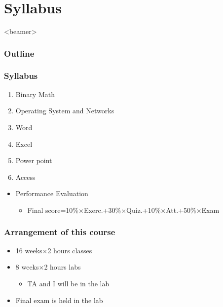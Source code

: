 \section{Syllabus}
\label{sec:sylla}
\begin{frame}<beamer>
    \frametitle{Outline}
    \tableofcontents[currentsection]
\end{frame}

\begin{frame}
	\frametitle{Syllabus}
	\begin{enumerate}
		\item {Binary Math}
		\item {Operating System and Networks}
		\item {Word}
		\item {Excel}
		\item {Power point}
		\item {Access}
	\end{enumerate}
	\begin{itemize}
		\item {Performance Evaluation}
		\begin{itemize}
			\item {Final score=10\%{$\times$}Exerc.+30\%{$\times$}Quiz.+10\%{$\times$}Att.+50\%{$\times$}Exam}
		\end{itemize}
	\end{itemize}
\end{frame}

\begin{frame}
	\frametitle{Arrangement of this course}
\begin{itemize}
	\item {16 weeks${\times}$2 hours classes}
	\item {8 weeks${\times}$2 hours labs}
	\begin{itemize}
			\item {TA and I will be in the lab}
	\end{itemize}
	\item {Final exam is held in the lab}
\end{itemize}
\end{frame}
